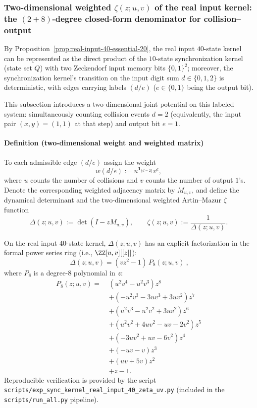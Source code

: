 \subsubsection{Two-dimensional weighted \texorpdfstring{$\zeta(z;u,v)$}{zeta(z;u,v)} of the real input kernel: the \texorpdfstring{$(2+8)$}{(2+8)}-degree closed-form denominator for collision--output}\label{app:real-input-40-zeta-uv}
By Proposition~\ref{prop:real-input-40-essential-20}, the real input $40$-state kernel can be represented as the direct product of the $10$-state synchronization kernel (state set $Q$) with two Zeckendorf input memory bits $\{0,1\}^2$;
moreover, the synchronization kernel's transition on the input digit sum $d\in\{0,1,2\}$ is deterministic, with edges carrying labels $(d/e)$ ($e\in\{0,1\}$ being the output bit).
\par
This subsection introduces a two-dimensional joint potential on this labeled system: simultaneously counting collision events $d=2$ (equivalently, the input pair $(x,y)=(1,1)$ at that step) and output bit $e=1$.

\paragraph{Definition (two-dimensional weight and weighted matrix)}
To each admissible edge $(d/e)$ assign the weight
\[
w(d/e):=u^{\mathbf{1}_{\{d=2\}}}v^{e},
\]
where $u$ counts the number of collisions and $v$ counts the number of output $1$'s.
Denote the corresponding weighted adjacency matrix by $M_{u,v}$, and define the dynamical determinant and the two-dimensional weighted Artin--Mazur $\zeta$ function
\[
\Delta(z;u,v):=\det(I-zM_{u,v}),
\qquad
\zeta(z;u,v):=\frac{1}{\Delta(z;u,v)}.
\]

\begin{theorem}\label{thm:real-input-40-det-uv-2plus8}
On the real input $40$-state kernel, $\Delta(z;u,v)$ has an explicit factorization in the formal power series ring (i.e., $\ZZ[u,v][[z]]$):
\[
\boxed{\ \Delta(z;u,v)=(vz^{2}-1)\,P_{8}(z;u,v)\ },
\]
where $P_{8}$ is a degree-$8$ polynomial in $z$:
\[
\boxed{
\begin{aligned}
P_8(z;u,v)=\;&(u^2 v^4-u^2 v^3)z^8\\
&+(-u^2 v^3-3u v^3+3u v^2)z^7\\
&+(u^2 v^3-u^2 v^2+3u v^2)z^6\\
&+(u^2 v^2+4u v^2-u v-2v^2)z^5\\
&+(-3u v^2+u v-6v^2)z^4\\
&+(-u v-v)z^3\\
&+(u v+5v)z^2\\
&+z-1.
\end{aligned}}
\]
Reproducible verification is provided by the script \texttt{scripts/exp\_sync\_kernel\_real\_input\_40\_zeta\_uv.py} (included in the \texttt{scripts/run\_all.py} pipeline).
\end{theorem}

